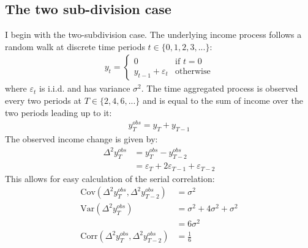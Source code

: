 \subsection{The two sub-division case}
I begin with the two-subdivision case. The underlying income process follows a random walk at discrete time periods $t\in \{0,1,2,3,...\}$:
\begin{align*}
y_t = \begin{cases}
0 \qquad & \text{if } t=0\\
y_{t-1} + \varepsilon_t & \text{otherwise}
\end{cases}
\end{align*}
where $\varepsilon_t$ is i.i.d. and has variance $\sigma^2$. The  time aggregated process is observed every two periods at $T\in\{2,4,6,...\}$ and is equal to the sum of income over the two periods leading up to it:
\begin{align*}
y_T^{obs} = y_T + y_{T-1}
\end{align*}
The observed income change is given by:
\begin{align*}
\Delta^2 y_T^{obs} &= y_T^{obs} - y_{T-2}^{obs} \\
&= \varepsilon_T + 2\varepsilon_{T-1} + \varepsilon_{T-2}
\end{align*}
This allows for easy calculation of the serial correlation:
\begin{align*}
\mathrm{Cov}(\Delta^2 y_T^{obs},\Delta^2 y_{T-2}^{obs}) &= \sigma^2 \\
\mathrm{Var}(\Delta^2 y_T^{obs}) &= \sigma^2 + 4\sigma^2 + \sigma^2 \\
&= 6\sigma^2 \\
\mathrm{Corr}(\Delta^2 y_T^{obs},\Delta^2 y_{T-2}^{obs}) &= \frac{1}{6}
\end{align*}

